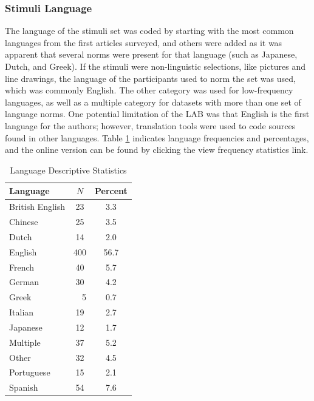 \documentclass[english,man]{apa6}
\theoremstyle{definition}
\theoremstyle{definition}
\theoremstyle{definition}
\theoremstyle{remark}
\begin{document}
\subsubsection{Stimuli Language}\label{stimuli-language}

The language of the stimuli set was coded by starting with the most
common languages from the first articles surveyed, and others were added
as it was apparent that several norms were present for that language
(such as Japanese, Dutch, and Greek). If the stimuli were non-linguistic
selections, like pictures and line drawings, the language of the
participants used to norm the set was used, which was commonly English.
The other category was used for low-frequency languages, as well as a
multiple category for datasets with more than one set of language norms.
One potential limitation of the LAB was that English is the first
language for the authors; however, translation tools were used to code
sources found in other languages. Table \ref{tab:lang-table} indicates
language frequencies and percentages, and the online version can be
found by clicking the view frequency statistics link.

\begin{table}[tbp]
\begin{center}
\begin{threeparttable}
\caption{\label{tab:lang-table}Language Descriptive Statistics}
\begin{tabular}{lcc}
\toprule
Language & $N$ & Percent\\
\midrule
British English & 23 & 3.3\\
Chinese & 25 & 3.5\\
Dutch & 14 & 2.0\\
English & 400 & 56.7\\
French & 40 & 5.7\\
German & 30 & 4.2\\
Greek & \ \ 5 & 0.7\\
Italian & 19 & 2.7\\
Japanese & 12 & 1.7\\
Multiple & 37 & 5.2\\
Other & 32 & 4.5\\
Portuguese & 15 & 2.1\\
Spanish & 54 & 7.6\\
\bottomrule
\end{tabular}
\end{threeparttable}
\end{center}
\end{table}
\end{document}
